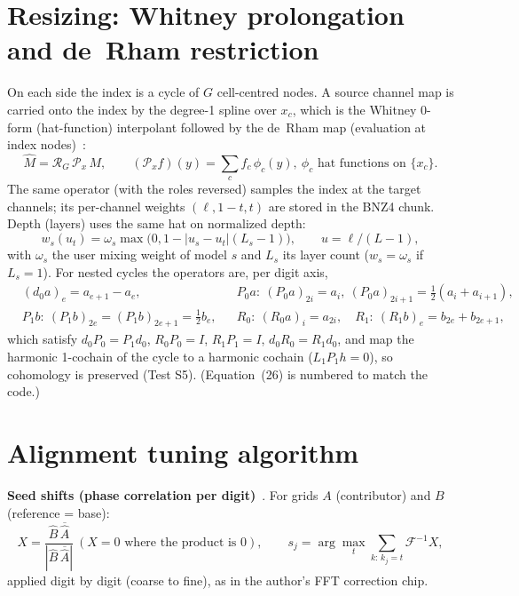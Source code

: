 \documentclass[11pt]{article}
\begin{document}
\section{Resizing: Whitney prolongation and de~Rham restriction}
On each side the index is a cycle of $G$ cell-centred nodes. A source channel map is carried onto the index by the degree-1 spline over $x_c$, which is the Whitney 0-form (hat-function) interpolant followed by the de~Rham map (evaluation at index nodes)~\cite{afw,whitney}:
\begin{equation}\widehat M=\mathcal R_{G}\,\mathcal P_{x}\,M,\qquad (\mathcal P_x f)(y)=\sum_c f_c\,\phi_c(y),\ \phi_c\text{ hat functions on }\{x_c\}. \tag{10}\end{equation}
The same operator (with the roles reversed) samples the index at the target channels; its per-channel weights $(\ell,1-t,t)$ are stored in the BNZ4 chunk. Depth (layers) uses the same hat on normalized depth:
\begin{equation}w_{s}(u_t)=\omega_s\max\bigl(0,1-|u_s-u_t|(L_s-1)\bigr),\qquad u=\ell/(L-1),\tag{11}\end{equation}
with $\omega_s$ the user mixing weight of model $s$ and $L_s$ its layer count ($w_s=\omega_s$ if $L_s=1$).
For nested cycles the operators are, per digit axis,
\begin{equation}\begin{aligned}
&(d_0a)_e=a_{e+1}-a_e, && P_0a:\ (P_0a)_{2i}=a_i,\ (P_0a)_{2i+1}=\tfrac12(a_i+a_{i+1}),\\
&P_1b:\ (P_1b)_{2e}=(P_1b)_{2e+1}=\tfrac12 b_e, && R_0:\ (R_0a)_i=a_{2i},\quad R_1:\ (R_1b)_e=b_{2e}+b_{2e+1},
\end{aligned}\tag{26}\end{equation}
which satisfy $d_0P_0=P_1d_0$, $R_0P_0=I$, $R_1P_1=I$, $d_0R_0=R_1d_0$, and map the harmonic 1-cochain of the cycle to a harmonic cochain ($L_1P_1h=0$), so cohomology is preserved (Test S5). (Equation~(26) is numbered to match the code.)

\section{Alignment tuning algorithm}
\textbf{Seed shifts (phase correlation per digit)}~\cite{reddy}. For grids $A$ (contributor) and $B$ (reference = base):
\begin{equation}X=\frac{\widehat B\,\overline{\widehat A}}{|\widehat B\,\overline{\widehat A}|}\ (X=0\text{ where the product is }0),\qquad s_j=\arg\max_{t}\sum_{k:\,k_j=t}\mathcal F^{-1}X ,\tag{12}\end{equation}
applied digit by digit (coarse to fine), as in the author's FFT correction chip.
\end{document}
